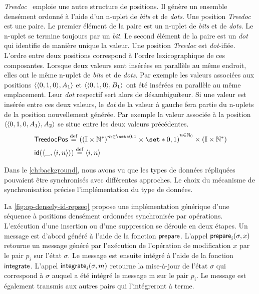 \emph{Treedoc}~\autocite{preguica_2009_treedoc} emploie une autre structure de positions.
Il génère un ensemble densément ordonné à l'aide d'un n-uplet de \emph{bits} et de \emph{dots}.
Une position \emph{Treedoc} est une paire.
Le premier élément de la paire est un n-uplet de \emph{bits} et de \emph{dots}.
Le n-uplet se termine toujours par un \emph{bit}.
Le second élément de la paire est un \emph{dot} qui identifie de manière unique la valeur.
Une position \emph{Treedoc} est \emph{dot}-ifiée.
L'ordre entre deux positions correspond à l'ordre lexicographique de ces composantes.
Lorsque deux valeurs sont insérées en parallèle au même endroit, elles ont le même n-uplet de \emph{bits} et de \emph{dots}.
Par exemple les valeurs associées aux positions $\tuple{\tuple*{0, 1, 0},A_1}$ et $\tuple{\tuple*{0, 1, 0},B_1}$ ont été insérées en parallèle au même emplacement.
Leur \emph{dot} respectif sert alors de désambiguïteur.
Si une valeur est insérée entre ces deux valeurs, le \emph{dot} de la valeur à gauche fera partie du n-uplets de la position nouvellement générée.
Par exemple la valeur associée à la position $\tuple{\tuple*{0, 1, 0, A_1},A_2}$ se situe entre les deux valeurs précédentes.
%
\begin{align}
&\trm{TreedocPos} \defeq {({(\mathbb{I} \times \mathbb{N}^*)}^{m \in \set*{0, 1}} \times \set*{0, 1})}^{n \in \mathbb{N}_0} \times (\mathbb{I} \times \mathbb{N}^*)\\
&\trm{id}(\tuple*{\_, \tuple*{i, n}}) \defeq \tuple*{i, n}
\end{align}

\clearpage

Dans le \autoref{ch:background}, nous avons vu que les types de données répliquées pouvaient être synchronisés avec différentes approches.
Le choix du mécanisme de synchronisation précise l'implémentation du type de données.

La \autoref{fig:op-densely-id-repseq} propose une implémentation générique d'une séquence à positions densément ordonnées synchronisée par opérations.
L'exécution d'une insertion ou d'une suppression se déroule en deux étapes.
Un message est d'abord généré à l'aide de la fonction $\operatorname{\mathsf{prepare}}$.
L'appel $\operatorname{\mathsf{prepare}}_i(\sigma, x)$ retourne un message généré par l’exécution de l’opération de modification $x$ par le pair $p_i$ sur l'état $\sigma$.
Le message est ensuite intégré à l'aide de la fonction $\operatorname{\mathsf{integrate}}$.
L'appel $\operatorname{\mathsf{integrate}}_i(\sigma, m)$ retourne la mise-à-jour de l’état $\sigma$ qui correspond à $\sigma$ auquel a été intégré le message m sur le pair $p_i$.
Le message est également transmis aux autres pairs qui l'intégreront à terme.

